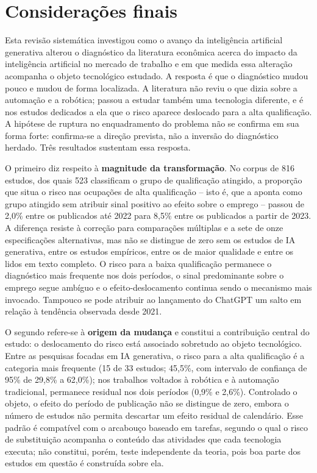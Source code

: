 \chapter{Considerações finais}\label{cap:fim}


Esta revisão sistemática investigou como o avanço da inteligência artificial generativa alterou o diagnóstico da literatura econômica acerca do impacto da inteligência artificial no mercado de trabalho e em que medida essa alteração acompanha o objeto tecnológico estudado. A resposta é que o diagnóstico mudou pouco e mudou de forma localizada. A literatura não reviu o que dizia sobre a automação e a robótica; passou a estudar também uma tecnologia diferente, e é nos estudos dedicados a ela que o risco aparece deslocado para a alta qualificação. A hipótese de ruptura no enquadramento do problema não se confirma em sua forma forte: confirma-se a direção prevista, não a inversão do diagnóstico herdado. Três resultados sustentam essa resposta.

O primeiro diz respeito à \textbf{magnitude da transformação}. No corpus de 816 estudos, dos quais 523 classificam o grupo de qualificação atingido, a proporção que situa o risco nas ocupações de alta qualificação -- isto é, que a aponta como grupo atingido sem atribuir sinal positivo ao efeito sobre o emprego -- passou de 2,0\% entre os publicados até 2022 para 8,5\% entre os publicados a partir de 2023. A diferença resiste à correção para comparações múltiplas e a sete de onze especificações alternativas, mas não se distingue de zero sem os estudos de IA generativa, entre os estudos empíricos, entre os de maior qualidade e entre os lidos em texto completo. O risco para a baixa qualificação permanece o diagnóstico mais frequente nos dois períodos, o sinal predominante sobre o emprego segue ambíguo e o efeito-deslocamento continua sendo o mecanismo mais invocado. Tampouco se pode atribuir ao lançamento do ChatGPT um salto em relação à tendência observada desde 2021.

O segundo refere-se à \textbf{origem da mudança} e constitui a contribuição central do estudo: o deslocamento do risco está associado sobretudo ao objeto tecnológico. Entre as pesquisas focadas em IA generativa, o risco para a alta qualificação é a categoria mais frequente (15 de 33 estudos; 45,5\%, com intervalo de confiança de 95\% de 29,8\% a 62,0\%); nos trabalhos voltados à robótica e à automação tradicional, permanece residual nos dois períodos (0,9\% e 2,6\%). Controlado o objeto, o efeito do período de publicação não se distingue de zero, embora o número de estudos não permita descartar um efeito residual de calendário. Esse padrão é compatível com o arcabouço baseado em tarefas, segundo o qual o risco de substituição acompanha o conteúdo das atividades que cada tecnologia executa; não constitui, porém, teste independente da teoria, pois boa parte dos estudos em questão é construída sobre ela.

